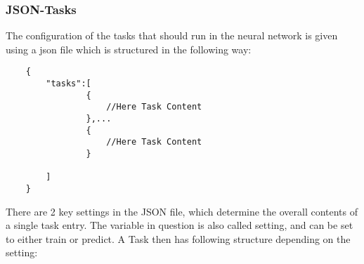 \documentclass{article}
\begin{document}
\subsubsection{JSON-Tasks}
\label{subsub:json}

The configuration of the tasks that should run in the neural network is given using a json file which is structured in the following way:
\begin{verbatim}
    {
        "tasks":[
                {
                    //Here Task Content    
                },...
                {
                    //Here Task Content 
                }
        
        ]
    }
\end{verbatim}

There are 2 key settings in the JSON file, which determine the overall contents of a single task entry. The variable in question is also called setting, and can be set to either train or predict. A Task then has following structure depending on the setting:
\end{document}
